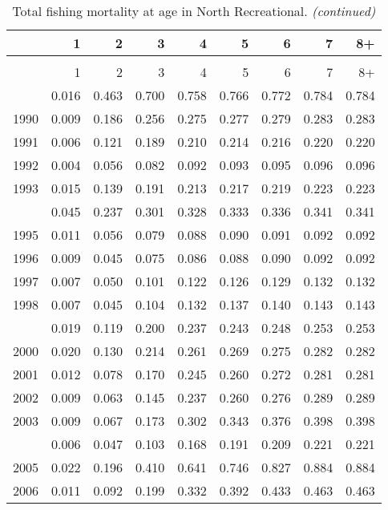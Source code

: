 \documentclass[
]{article}
\begin{document}
\begin{longtable}[t]{lrrrrrrrr}
\caption{\label{tab:North_Recreational-fleet-FAA-table}Total fishing mortality at age in North Recreational.}\\
\toprule
  & 1 & 2 & 3 & 4 & 5 & 6 & 7 & 8+\\
\midrule
\endfirsthead
\caption[]{Total fishing mortality at age in North Recreational. \textit{(continued)}}\\
\toprule
  & 1 & 2 & 3 & 4 & 5 & 6 & 7 & 8+\\
\midrule
\endhead

\endfoot
\bottomrule
\endlastfoot
1989 & 0.016 & 0.463 & 0.700 & 0.758 & 0.766 & 0.772 & 0.784 & 0.784\\
1990 & 0.009 & 0.186 & 0.256 & 0.275 & 0.277 & 0.279 & 0.283 & 0.283\\
1991 & 0.006 & 0.121 & 0.189 & 0.210 & 0.214 & 0.216 & 0.220 & 0.220\\
1992 & 0.004 & 0.056 & 0.082 & 0.092 & 0.093 & 0.095 & 0.096 & 0.096\\
1993 & 0.015 & 0.139 & 0.191 & 0.213 & 0.217 & 0.219 & 0.223 & 0.223\\
\addlinespace
1994 & 0.045 & 0.237 & 0.301 & 0.328 & 0.333 & 0.336 & 0.341 & 0.341\\
1995 & 0.011 & 0.056 & 0.079 & 0.088 & 0.090 & 0.091 & 0.092 & 0.092\\
1996 & 0.009 & 0.045 & 0.075 & 0.086 & 0.088 & 0.090 & 0.092 & 0.092\\
1997 & 0.007 & 0.050 & 0.101 & 0.122 & 0.126 & 0.129 & 0.132 & 0.132\\
1998 & 0.007 & 0.045 & 0.104 & 0.132 & 0.137 & 0.140 & 0.143 & 0.143\\
\addlinespace
1999 & 0.019 & 0.119 & 0.200 & 0.237 & 0.243 & 0.248 & 0.253 & 0.253\\
2000 & 0.020 & 0.130 & 0.214 & 0.261 & 0.269 & 0.275 & 0.282 & 0.282\\
2001 & 0.012 & 0.078 & 0.170 & 0.245 & 0.260 & 0.272 & 0.281 & 0.281\\
2002 & 0.009 & 0.063 & 0.145 & 0.237 & 0.260 & 0.276 & 0.289 & 0.289\\
2003 & 0.009 & 0.067 & 0.173 & 0.302 & 0.343 & 0.376 & 0.398 & 0.398\\
\addlinespace
2004 & 0.006 & 0.047 & 0.103 & 0.168 & 0.191 & 0.209 & 0.221 & 0.221\\
2005 & 0.022 & 0.196 & 0.410 & 0.641 & 0.746 & 0.827 & 0.884 & 0.884\\
2006 & 0.011 & 0.092 & 0.199 & 0.332 & 0.392 & 0.433 & 0.463 & 0.463\\

\end{longtable}
\end{document}
